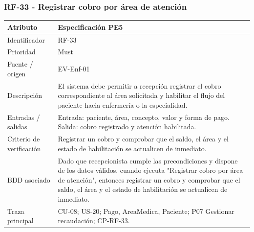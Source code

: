 \documentclass[11pt,a4paper]{article}
\begin{document}
	\subsubsection{RF-33 - Registrar cobro por área de atención}
	\begin{tabularx}{\textwidth}{p{3.2cm}Y}
		\toprule
		\textbf{Atributo} & \textbf{Especificación PE5}\\\midrule
		Identificador & RF-33\\
		Prioridad & Must\\
		Fuente / origen & EV-Enf-01\\
		Descripción & El sistema debe permitir a recepción registrar el cobro correspondiente al área solicitada y habilitar el flujo del paciente hacia enfermería o la especialidad.\\
		Entradas / salidas & Entrada: paciente, área, concepto, valor y forma de pago. Salida: cobro registrado y atención habilitada.\\
		Criterio de verificación & Registrar un cobro y comprobar que el saldo, el área y el estado de habilitación se actualicen de inmediato.\\
		BDD asociado & Dado que recepcionista cumple las precondiciones y dispone de los datos válidos, cuando ejecuta "Registrar cobro por área de atención", entonces registrar un cobro y comprobar que el saldo, el área y el estado de habilitación se actualicen de inmediato.\\
		Traza principal & CU-08; US-20; Pago, AreaMedica, Paciente; P07 Gestionar recaudación; CP-RF-33.\\
		\bottomrule
	\end{tabularx}
\end{document}
